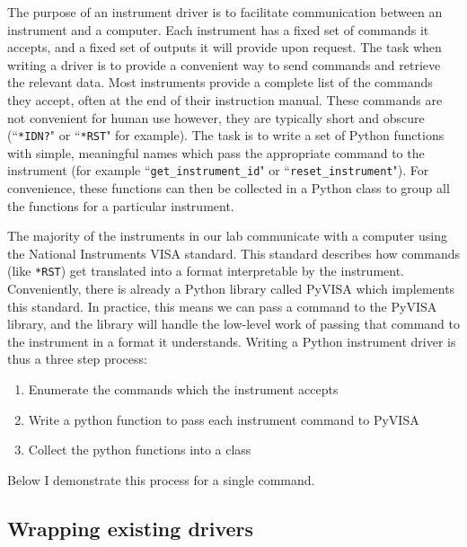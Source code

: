 \documentclass[edeposit,fullpage,draftthesis]{uiucthesis2009}
\newcommand{\code}[1]{\texttt{#1}}
\begin{document}
\begin{appendices}
    The purpose of an instrument driver is to facilitate communication between an instrument and a
    computer. Each instrument has a fixed set of commands it accepts, and a fixed set of outputs it will
    provide upon request. The task when writing a driver is to provide a convenient way to send commands
    and retrieve the relevant data.
    Most instruments provide a complete list of the commands they accept, often at the end of their instruction manual.
    These commands are not convenient for human use however, they are typically short and obscure 
    (``\code{*IDN?}" or ``\code{*RST}" for example).
    The task is to write a set of Python functions with simple, meaningful names which pass the
    appropriate command to the instrument (for example ``\code{get\_instrument\_id}" or ``\code{reset\_instrument}"). 
    For convenience, these functions can then be collected in a
    Python class to group all the functions for a particular instrument.
    
    The majority of the instruments in our lab communicate with a computer using the National Instruments VISA
    standard. This standard describes how commands (like \code{*RST}) get translated into a format interpretable by the instrument.
    Conveniently, there is already a Python library called PyVISA which implements this standard.
    In practice, this means we can pass a command to the PyVISA library, and the library will handle the low-level
    work of passing that command to the instrument in a format it understands.
    Writing a Python instrument driver is thus a three step process:
    \begin{enumerate}
        \item Enumerate the commands which the instrument accepts
        \item Write a python function to pass each instrument command to PyVISA
        \item Collect the python functions into a class
    \end{enumerate}
    Below I demonstrate this process for a single command.
    
    
    \subsection{Wrapping existing drivers}
    

\end{appendices}
\end{document}
